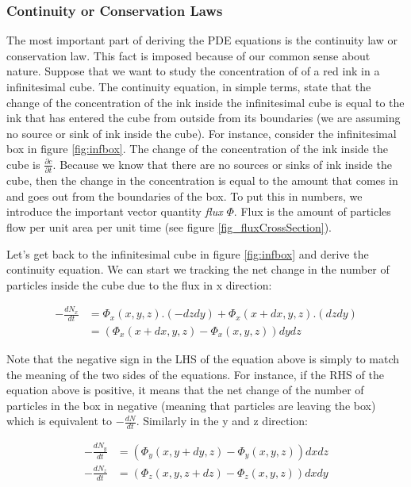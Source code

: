 \subsubsection{Continuity or Conservation Laws}
The most important part of deriving the PDE equations is the continuity law or conservation law. This fact is imposed because of our common sense about nature. Suppose that we want to study the concentration of of a red ink in a infinitesimal cube. The continuity equation, in simple terms, state that the change of the concentration of the ink inside the infinitesimal cube is equal to the ink that has entered the cube from outside from its boundaries (we are assuming no source or sink of ink inside the cube). For instance, consider the infinitesimal box in figure \ref{fig:infbox}. The change of the concentration of the ink inside the cube is $\frac{\partial c}{\partial t}$. Because we know that there are no sources or sinks of ink inside the cube, then the change in the concentration is equal to the amount that comes in and goes out from the boundaries of the box. To put this in numbers, we introduce the important vector quantity \emph{flux} $ \Phi $. Flux is the amount of particles flow per unit area per unit time (see figure \ref{fig_fluxCrossSection}).





\newpage

Let's get back to the infinitesimal cube in figure \ref{fig:infbox} and derive the continuity equation. We can start we tracking the net change in the number of particles inside the cube due to the flux in x direction:

\begin{align*}
	-\frac{dN_x}{dt} &= \Phi_x(x,y,z) . (-dz dy) + \Phi_x(x +dx, y,z) . (dzdy) \\
	 				&= (\Phi_x(x+dx,y,z)-\Phi_x(x,y,z))dydz 
\end{align*}

Note that the negative sign in the LHS of the equation above is simply to match the meaning of the two sides of the equations. For instance, if the RHS of the equation above is positive, it means that the net change of the number of particles in the box in negative (meaning that particles are leaving the box) which is equivalent to $ -\frac{dN}{dt} $. Similarly in the y and z direction:

\begin{align*}
	-\frac{dN_y}{dt} &= (\Phi_y(x,y+dy,z)-\Phi_y(x,y,z)) dx dz \\
	-\frac{dN_z}{dt} &= (\Phi_z(x,y,z+dz) - \Phi_z(x,y,z)) dx dy
\end{align*}

